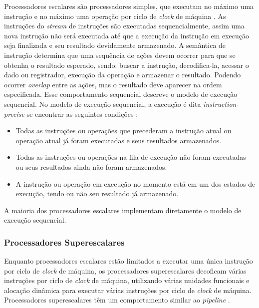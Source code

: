 Processadores escalares são processadores simples, que executam no 
máximo uma instrução e no máximo uma operação por ciclo de \textit{clock} de 
máquina \cite[3.5]{aapc}. 
As instruções do \textit{stream} de instruções são executadas 
sequencialmente, assim uma nova instrução não será executada até que a execução 
da instrução em execução seja finalizada e seu resultado devidamente
armazenado.
A semântica de instrução determina que uma sequência de ações devem ocorrer
para que se obtenha o resultado esperado, sendo: buscar a instrução,
decodifica-la, acessar o dado ou registrador, execução da operação e armazenar o
resultado. 
Podendo ocorrer \textit{overlap} entre as ações, mas o resultado deve
aparecer na ordem especificada.
Esse comportamento sequencial descreve o modelo de execução sequencial.
No modelo de execução sequencial, a execução é dita \textit{instruction-precise}
se encontrar as seguintes condições \cite{eopc}:

\begin{itemize}
        \item Todas as instruções ou operações que precederam a instrução atual
                ou operação atual já foram executadas e seus resultados
                armazenados.
        \item Todas as instruções ou operações na fila de execução não foram
                executadas ou seus resultados ainda não foram armazenados.
        \item A instrução ou operação em execução no momento está em um dos
                estados de execução, tendo ou não seu resultado já armazenado.
\end{itemize}

A maioria dos processadores escalares implementam diretamente o modelo de
execução sequencial.


\subsubsection{Processadores Superescalares}

Enquanto processadores escalares estão limitados a executar uma única instrução 
por ciclo de \textit{clock} de máquina, os processadores superescalares decoficam
várias instruções por ciclo de \textit{clock} de máquina, utilizando várias
unidades funcionais e alocação dinâmica para executar várias instruções por
ciclo de \textit{clock} de máquina. 
Processadores superescalares têm um comportamento similar ao \textit{pipeline}
\cite{eopc}.

